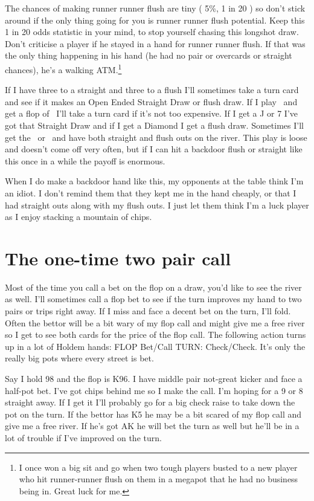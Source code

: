 The chances of making runner runner flush are tiny ( 5\%, 1 in 20 )
so don't stick around if the only thing going for you is runner
runner flush potential. Keep this 1 in 20 odds statistic in your
mind, to stop yourself chasing this longshot draw.
Don't criticise a player if he stayed in a hand for runner
runner flush. If that was the only thing happening in his hand
(he had no pair or overcards or straight chances), he's a walking
ATM.\footnote{I once won a big sit and go when two tough players
busted to a new player who hit runner-runner flush on them
in a megapot that he had no business being in. Great luck for me.}

If I have three to a straight and three to a flush I'll sometimes
take a turn card and see if it makes an Open Ended Straight Draw or
flush draw. If I play \tend\nined\ and get a flop of \Ah\eigd\twoc\ I'll take a
turn card if it's not too expensive. If I get a J or 7 I've got
that Straight Draw and if I get a Diamond I get a flush draw.
Sometimes I'll get the \Jd\ or \sevd\ and have both straight
and flush outs on the river. This play is loose and doesn't
come off very often, but if I can hit a backdoor flush or straight
like this once in a while the payoff is enormous.

When I do make a backdoor hand like this, my opponents at the table
think I'm an idiot. I don't remind them that they kept me in
the hand cheaply, or that I had straight outs along with my flush
outs. I just let them think I'm a luck player as I enjoy stacking a
mountain of chips.

\section{The one-time two pair call}

Most of the time you call a bet on the flop on a draw, you'd like to
see the river as well. I'll sometimes call a flop bet to see if the
turn improves my hand to two pairs or trips right away.
If I miss and face a decent bet on the turn, I'll fold.
Often the bettor will be a bit wary of my flop call and might
give me a free river so I get to see both cards for the price of the
flop call. The following action turns up in a lot of Holdem hands:
FLOP Bet/Call TURN: Check/Check. It's only the really big pots where
every street is bet.

Say I hold 98 and the flop is K96. I have middle pair not-great
kicker and face a half-pot bet. I've got chips behind me so I make
the call. I'm hoping for a 9 or 8 straight away. If I get it I'll
probably go for a big check raise to take down the pot on the turn. If
the bettor has K5 he may be a bit scared of my flop call and give
me a free river. If he's got AK he will bet the turn as well but he'll
be in a lot of trouble if I've improved on the turn.

